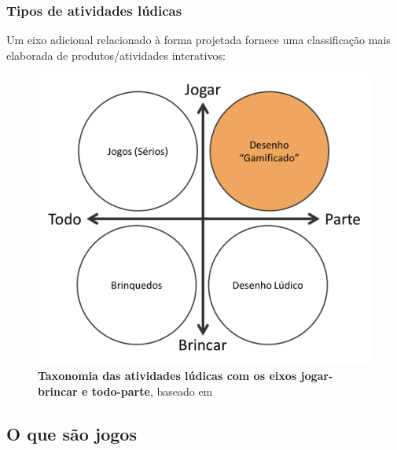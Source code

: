 \expandafter\documentclass\expandafter[table, usenames, svgnames, dvipsnames, \classopts]{beamer}
\begin{document}
\begin{frame} 
	\frametitle{\textbf{Tipos de atividades lúdicas}}

	Um eixo adicional relacionado à forma projetada fornece uma classificação mais elaborada de produtos/atividades interativos:
	
    \begin{figure}
	    \centering
        \includegraphics[height=0.65\paperheight]{taxonomy}
        \caption{\textbf{Taxonomia das atividades lúdicas com os eixos jogar-brincar e todo-parte}, baseado em \cite{Groh2012}}
    \end{figure}

\end{frame}


\subsection{O que são jogos}
\end{document}
